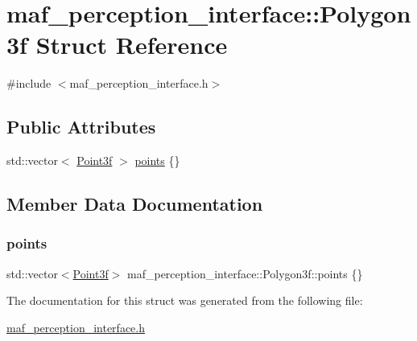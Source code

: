\hypertarget{structmaf__perception__interface_1_1Polygon3f}{}\section{maf\+\_\+perception\+\_\+interface\+:\+:Polygon3f Struct Reference}
\label{structmaf__perception__interface_1_1Polygon3f}


{\ttfamily \#include $<$maf\+\_\+perception\+\_\+interface.\+h$>$}

\subsection*{Public Attributes}
\begin{DoxyCompactItemize}
\item 
std\+::vector$<$ \hyperlink{structmaf__perception__interface_1_1Point3f}{Point3f} $>$ \hyperlink{structmaf__perception__interface_1_1Polygon3f_a6c8766e73a3a55d600885ce5f0d89174}{points} \{\}
\end{DoxyCompactItemize}


\subsection{Member Data Documentation}
\mbox{\label{structmaf__perception__interface_1_1Polygon3f_a6c8766e73a3a55d600885ce5f0d89174}} 
\subsubsection{\texorpdfstring{points}{points}}
{\footnotesize\ttfamily std\+::vector$<$\hyperlink{structmaf__perception__interface_1_1Point3f}{Point3f}$>$ maf\+\_\+perception\+\_\+interface\+::\+Polygon3f\+::points \{\}}



The documentation for this struct was generated from the following file\+:\begin{DoxyCompactItemize}
\item 
\hyperlink{maf__perception__interface_8h}{maf\+\_\+perception\+\_\+interface.\+h}\end{DoxyCompactItemize}
